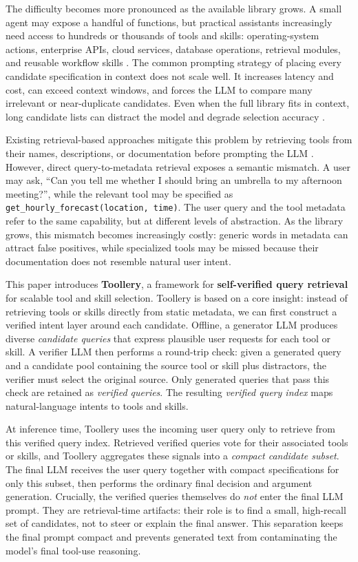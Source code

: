 \documentclass[11pt]{article}
\begin{document}
The difficulty becomes more pronounced as the available library grows. A small agent may expose a handful of functions, but practical assistants increasingly need access to hundreds or thousands of tools and skills: operating-system actions, enterprise APIs, cloud services, database operations, retrieval modules, and reusable workflow skills \citep{wu2024copilot, boto3, mo2025livemcpbench, xu2025tps}. The common prompting strategy of placing every candidate specification in context does not scale well. It increases latency and cost, can exceed context windows, and forces the LLM to compare many irrelevant or near-duplicate candidates. Even when the full library fits in context, long candidate lists can distract the model and degrade selection accuracy \citep{paramanayakam2025less}.

Existing retrieval-based approaches mitigate this problem by retrieving tools from their names, descriptions, or documentation before prompting the LLM \citep{agarwal2025toolrm, lin2025masstool}. However, direct query-to-metadata retrieval exposes a semantic mismatch. A user may ask, ``Can you tell me whether I should bring an umbrella to my afternoon meeting?'', while the relevant tool may be specified as \texttt{get\_hourly\_forecast(location, time)}. The user query and the tool metadata refer to the same capability, but at different levels of abstraction. As the library grows, this mismatch becomes increasingly costly: generic words in metadata can attract false positives, while specialized tools may be missed because their documentation does not resemble natural user intent.

This paper introduces \textbf{Toollery}, a framework for \textbf{self-verified query retrieval} for scalable tool and skill selection. Toollery is based on a core insight: instead of retrieving tools or skills directly from static metadata, we can first construct a verified intent layer around each candidate. Offline, a generator LLM produces diverse \emph{candidate queries} that express plausible user requests for each tool or skill. A verifier LLM then performs a round-trip check: given a generated query and a candidate pool containing the source tool or skill plus distractors, the verifier must select the original source. Only generated queries that pass this check are retained as \emph{verified queries}. The resulting \emph{verified query index} maps natural-language intents to tools and skills.

At inference time, Toollery uses the incoming user query only to retrieve from this verified query index. Retrieved verified queries vote for their associated tools or skills, and Toollery aggregates these signals into a \emph{compact candidate subset}. The final LLM receives the user query together with compact specifications for only this subset, then performs the ordinary final decision and argument generation. Crucially, the verified queries themselves do \emph{not} enter the final LLM prompt. They are retrieval-time artifacts: their role is to find a small, high-recall set of candidates, not to steer or explain the final answer. This separation keeps the final prompt compact and prevents generated text from contaminating the model's final tool-use reasoning.
\end{document}
